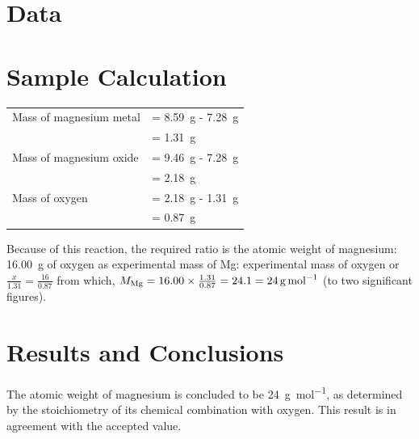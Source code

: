 \documentclass{article}
\begin{document}
 

\section{Data}




\section{Sample Calculation}

\begin{tabular}{ll}
Mass of magnesium metal & = \SI{8.59}{\gram} - \SI{7.28}{\gram}\\
& = \SI{1.31}{\gram}\\
Mass of magnesium oxide & = \SI{9.46}{\gram} - \SI{7.28}{\gram}\\
& = \SI{2.18}{\gram}\\
Mass of oxygen & = \SI{2.18}{\gram} - \SI{1.31}{\gram}\\
& = \SI{0.87}{\gram}
\end{tabular}

Because of this reaction, the required ratio is the atomic weight of magnesium: \SI{16.00}{\gram} of oxygen as experimental mass of Mg: experimental mass of oxygen or $\frac{x}{1.31}=\frac{16}{0.87}$ from which, $M_{\ce{Mg}} = 16.00 \times \frac{1.31}{0.87} = 24.1 = \SI{24}{\gram\per\mole}$ (to two significant figures).


\section{Results and Conclusions}

The atomic weight of magnesium is concluded to be \SI{24}{\gram\per\mol}, as determined by the stoichiometry of its chemical combination with oxygen. This result is in agreement with the accepted value.
\end{document}
